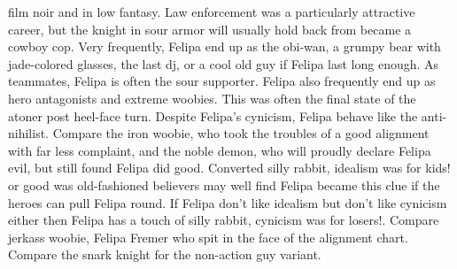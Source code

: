 \documentclass[12pt]{book}
\begin{document}
film noir and in low fantasy. Law enforcement was a particularly attractive career, but the knight in sour armor will usually hold back from became a cowboy cop. Very frequently, Felipa end up as the obi-wan, a grumpy bear with jade-colored glasses, the last dj, or a cool old guy if Felipa last long enough. As teammates, Felipa is often the sour supporter. Felipa also frequently end up as hero antagonists and extreme woobies. This was often the final state of the atoner post heel-face turn. Despite Felipa's cynicism, Felipa behave like the anti-nihilist. Compare the iron woobie, who took the troubles of a good alignment with far less complaint, and the noble demon, who will proudly declare Felipa evil, but still found Felipa did good. Converted silly rabbit, idealism was for kids! or good was old-fashioned believers may well find Felipa became this clue if the heroes can pull Felipa round. If Felipa don't like idealism but don't like cynicism either then Felipa has a touch of silly rabbit, cynicism was for losers!. Compare jerkass woobie, Felipa Fremer who spit in the face of the alignment chart. Compare the snark knight for the non-action guy variant.
\end{document}
